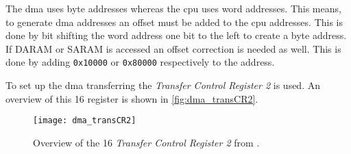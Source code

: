 The \gls{dma} uses byte addresses whereas the \gls{cpu} uses word addresses. This means, to generate \gls{dma} addresses an offset must be added to the \gls{cpu} addresses. This is done by bit shifting the word address one bit to the left to create a byte address. If DARAM or SARAM is accessed an offset correction is needed as well. This is done by adding \texttt{0x10000} or \texttt{0x80000} respectively to the address.


To set up the \gls{dma} transferring the \textit{Transfer Control Register 2} is used. An overview of this \SI{16}{\bit} register is shown in \autoref{fig:dma_transCR2}.

\begin{figure}[htbp]
	\centering
	\texttt{[image: dma\_transCR2]}
	\caption{Overview of the \SI{16}{\bit} \textit{Transfer Control Register 2} from \cite{dsp_dma}.}
	\label{fig:dma_transCR2}
\end{figure} 
